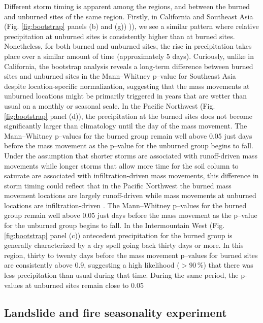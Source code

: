 \documentclass[nhess, manuscript]{copernicus}
\begin{document}
Different storm timing is apparent among the regions, and between the burned and 
unburned sites of the same region. Firstly, in California and Southeast Asia 
(Fig. \ref{fig:bootstrap} panels (b) and (g))
)), we see a similar pattern where relative precipitation at unburned sites is consistently higher than at burned sites. Nonetheless, for both burned and unburned sites, the rise in precipitation takes place over a similar amount of time (approximately 5 days). Curiously, unlike in California, the bootstrap analysis reveals a long-term difference between burned sites and unburned sites in the Mann–Whitney p–value for Southeast Asia despite location-specific normalization, suggesting that the mass movements at unburned locations might be primarily triggered in years that are wetter than usual on a monthly or seasonal scale. In the Pacific Northwest 
(Fig. \ref{fig:bootstrap} panel (d)), 
the precipitation at the burned sites does not become significantly larger than climatology until the day of the mass movement. The Mann–Whitney p–values for the burned group remain well above 0.05 just days before the mass movement as the p–value for the unburned group begins to fall. Under the assumption that shorter storms are associated with runoff-driven mass movements while longer storms that allow more time for the soil column to saturate are associated with infiltration-driven mass movements, this difference in storm timing could reflect that in the Pacific Northwest the burned mass movement locations are largely runoff-driven while mass movements at unburned locations are infiltration-driven 
\citep{cannonWildfirerelatedDebrisFlow2005}.
The Mann--Whitney p--values for the burned group remain well above \(0.05\) just days before the mass movement as the p--value for the
unburned group begins to fall. In the Intermountain West
(Fig. \ref{fig:bootstrap} panel (c))
antecedent precipitation for the
burned group is generally characterized by a dry spell going back thirty
days or more. In this region, thirty to twenty days before the mass movement p--values for burned sites are
consistently above \(0.9\), suggesting a high likelihood (\(>90\,\%\)) that there
was less precipitation than usual during that time. During the same period, the p-values at unburned sites remain close to 0.05


\subsection{Landslide and fire seasonality experiment}
\label{sec:result-seasonality}
\end{document}
